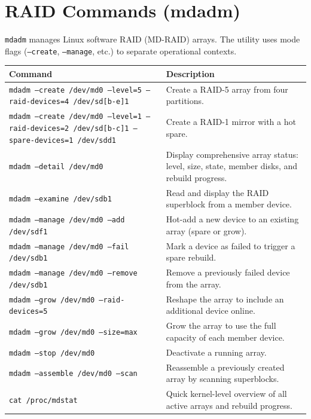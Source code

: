 \section*{RAID Commands (mdadm)}

\texttt{mdadm} manages Linux software RAID (MD-RAID) arrays. The utility uses
mode flags (\texttt{--create}, \texttt{--manage}, etc.) to separate
operational contexts.

\begin{longtable}{p{4cm} p{8cm}}
\toprule
\textbf{Command} & \textbf{Description} \\
\midrule
\endhead
\texttt{mdadm --create /dev/md0 --level=5 --raid-devices=4 /dev/sd[b-e]1} & Create a RAID-5 array from four partitions. \\
\texttt{mdadm --create /dev/md0 --level=1 --raid-devices=2 /dev/sd[b-c]1 --spare-devices=1 /dev/sdd1} & Create a RAID-1 mirror with a hot spare. \\
\texttt{mdadm --detail /dev/md0} & Display comprehensive array status: level, size, state, member disks, and rebuild progress. \\
\texttt{mdadm --examine /dev/sdb1} & Read and display the RAID superblock from a member device. \\
\texttt{mdadm --manage /dev/md0 --add /dev/sdf1} & Hot-add a new device to an existing array (spare or grow). \\
\texttt{mdadm --manage /dev/md0 --fail /dev/sdb1} & Mark a device as failed to trigger a spare rebuild. \\
\texttt{mdadm --manage /dev/md0 --remove /dev/sdb1} & Remove a previously failed device from the array. \\
\texttt{mdadm --grow /dev/md0 --raid-devices=5} & Reshape the array to include an additional device online. \\
\texttt{mdadm --grow /dev/md0 --size=max} & Grow the array to use the full capacity of each member device. \\
\texttt{mdadm --stop /dev/md0} & Deactivate a running array. \\
\texttt{mdadm --assemble /dev/md0 --scan} & Reassemble a previously created array by scanning superblocks. \\
\texttt{cat /proc/mdstat} & Quick kernel-level overview of all active arrays and rebuild progress. \\
\bottomrule
\end{longtable}

